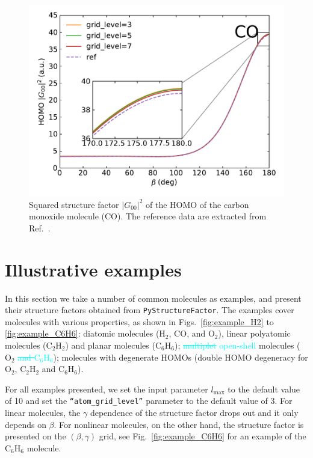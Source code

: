\documentclass[preprint,12pt]{elsarticle} %
\renewcommand{\rm}[1]{\mathrm{#1}}    %
\newcommand{\abs}[1]{\lvert #1 \rvert}  %
\newcommand{\cyan}[1]{\textcolor{cyan}{#1}}     %
\newcommand{\cout}[1]{\textcolor{cyan}{\sout{#1}}}
\begin{document}
\begin{figure}[tb]
    \centering
    \includegraphics[width=\columnwidth]{CO_ConvTest_sub_20230226.pdf}
    \caption{Squared structure factor $\abs{G_{00}}^2$ of the HOMO of the carbon monoxide molecule ($\rm{CO}$). The reference data are extracted from Ref.~\cite{saito_structure_2015}.}
    \label{fig:convtest_CO}
\end{figure}


\section{Illustrative examples}
\label{sec:example}

In this section we take a number of common molecules as examples, and present their structure factors obtained from \texttt{PyStructureFactor}. The examples cover molecules with various properties, as shown in Figs.~\ref{fig:example_H2} to \ref{fig:example_C6H6}: diatomic molecules ($\rm{H}_2$, $\rm{CO}$, and $\rm{O}_2$), linear polyatomic molecules ($\rm{C}_2\rm{H}_2$) and planar molecules ($\rm{C}_6\rm{H}_6$); \cout{multiplet} \cyan{open-shell} molecules ($\rm{O}_2$ \cout{and $\rm{C}_6\rm{H}_6$}); molecules with degenerate HOMOs (double HOMO degeneracy for $\rm{O}_2$, $\rm{C}_2\rm{H}_2$ and $\rm{C}_6\rm{H}_6$).

For all examples presented, we set the input parameter $l_{\rm{max}}$ to the default value of 10 and set the \texttt{``atom\_grid\_level''} parameter to the default value of 3.
For linear molecules, the $\gamma$ dependence of the structure factor drops out and it only depends on $\beta$. For nonlinear molecules, on the other hand, the structure factor is presented on the $(\beta,\gamma)$ grid, see Fig.~\ref{fig:example_C6H6} for an example of the $\rm{C}_6\rm{H}_6$ molecule.
\end{document}
